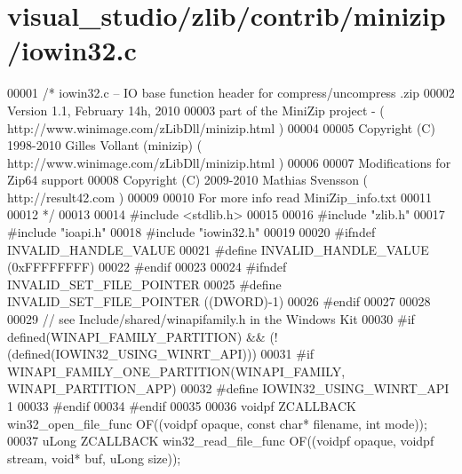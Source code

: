 \hypertarget{visual__studio_2zlib_2contrib_2minizip_2iowin32_8c_source}{}\section{visual\+\_\+studio/zlib/contrib/minizip/iowin32.c}
\label{visual__studio_2zlib_2contrib_2minizip_2iowin32_8c_source}

\begin{DoxyCode}
00001 \textcolor{comment}{/* iowin32.c -- IO base function header for compress/uncompress .zip}
00002 \textcolor{comment}{     Version 1.1, February 14h, 2010}
00003 \textcolor{comment}{     part of the MiniZip project - ( http://www.winimage.com/zLibDll/minizip.html )}
00004 \textcolor{comment}{}
00005 \textcolor{comment}{         Copyright (C) 1998-2010 Gilles Vollant (minizip) ( http://www.winimage.com/zLibDll/minizip.html )}
00006 \textcolor{comment}{}
00007 \textcolor{comment}{         Modifications for Zip64 support}
00008 \textcolor{comment}{         Copyright (C) 2009-2010 Mathias Svensson ( http://result42.com )}
00009 \textcolor{comment}{}
00010 \textcolor{comment}{     For more info read MiniZip\_info.txt}
00011 \textcolor{comment}{}
00012 \textcolor{comment}{*/}
00013 
00014 \textcolor{preprocessor}{#include <stdlib.h>}
00015 
00016 \textcolor{preprocessor}{#include "zlib.h"}
00017 \textcolor{preprocessor}{#include "ioapi.h"}
00018 \textcolor{preprocessor}{#include "iowin32.h"}
00019 
00020 \textcolor{preprocessor}{#ifndef INVALID\_HANDLE\_VALUE}
00021 \textcolor{preprocessor}{#define INVALID\_HANDLE\_VALUE (0xFFFFFFFF)}
00022 \textcolor{preprocessor}{#endif}
00023 
00024 \textcolor{preprocessor}{#ifndef INVALID\_SET\_FILE\_POINTER}
00025 \textcolor{preprocessor}{#define INVALID\_SET\_FILE\_POINTER ((DWORD)-1)}
00026 \textcolor{preprocessor}{#endif}
00027 
00028 
00029 \textcolor{comment}{// see Include/shared/winapifamily.h in the Windows Kit}
00030 \textcolor{preprocessor}{#if defined(WINAPI\_FAMILY\_PARTITION) && (!(defined(IOWIN32\_USING\_WINRT\_API)))}
00031 \textcolor{preprocessor}{#if WINAPI\_FAMILY\_ONE\_PARTITION(WINAPI\_FAMILY, WINAPI\_PARTITION\_APP)}
00032 \textcolor{preprocessor}{#define IOWIN32\_USING\_WINRT\_API 1}
00033 \textcolor{preprocessor}{#endif}
00034 \textcolor{preprocessor}{#endif}
00035 
00036 voidpf  ZCALLBACK win32\_open\_file\_func  OF((voidpf opaque, \textcolor{keyword}{const} \textcolor{keywordtype}{char}* filename, \textcolor{keywordtype}{int} mode));
00037 uLong   ZCALLBACK win32\_read\_file\_func  OF((voidpf opaque, voidpf stream, \textcolor{keywordtype}{void}* buf, uLong size));

\end{DoxyCode}
